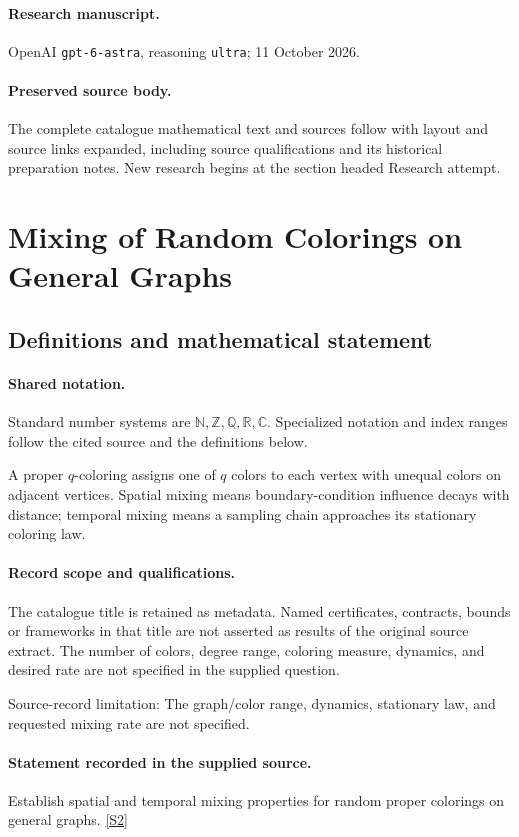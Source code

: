 \documentclass[11pt]{article}
\begin{document}
\paragraph{Research manuscript.} OpenAI \texttt{gpt-6-astra}, reasoning \texttt{ultra}; 11 October 2026.
\paragraph{Preserved source body.} The complete catalogue mathematical text and sources follow with layout and source links expanded, including source qualifications and its historical preparation notes. New research begins at the section headed Research attempt.

\section{Mixing of Random Colorings on General Graphs}\label{statement}

\subsection{Definitions and mathematical statement}

\paragraph{Shared notation.}Standard number systems are $\mathbb N,\mathbb Z,\mathbb Q,\mathbb R,\mathbb C$. Specialized notation and index ranges follow the cited source and the definitions below.


A proper $q$-coloring assigns one of $q$ colors to each vertex with unequal colors on adjacent vertices. Spatial mixing means boundary-condition influence decays with distance; temporal mixing means a sampling chain approaches its stationary coloring law.
\paragraph{Record scope and qualifications.}
The catalogue title is retained as metadata. Named certificates, contracts, bounds or frameworks in that title are not asserted as results of the original source extract.
The number of colors, degree range, coloring measure, dynamics, and desired rate are not specified in the supplied question.

Source-record limitation: The graph/color range, dynamics, stationary law, and requested mixing rate are not specified.
\paragraph{Statement recorded in the supplied source.}
Establish spatial and temporal mixing properties for random proper colorings on general graphs. \href{https://doi.org/10.4171/owr/2024/27}{[S2]}
\end{document}
